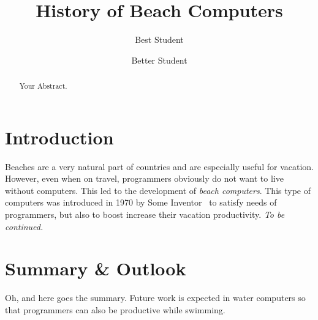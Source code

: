 \documentclass[sigplan,11pt,nonacm]{acmart}
\begin{document}
\title{History of Beach Computers}
\author{Best Student}
\author{Better Student}

\begin{abstract}
Your Abstract.
\end{abstract}


\maketitle

\section{Introduction}
\label{sec:introduction}

Beaches are a very natural part of countries and are especially useful for vacation. However, even when on travel, programmers obviously do not want to live without computers. This led to the development of \emph{beach computers}. This type of computers was introduced in 1970 by Some Inventor~\cite{intel2019man} %
to satisfy needs of programmers, but also to boost increase their vacation productivity. \textit{To be continued.}

\section{Summary \& Outlook}
\label{sec:summary}

Oh, and here goes the summary. Future work is expected in water computers so that programmers can also be productive while swimming.


\end{document}
